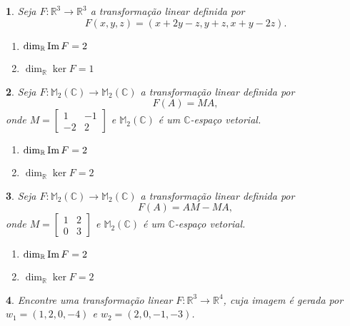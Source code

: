 \documentclass[12pt]{exam}
\newtheorem{exercicio}{}
\newcommand{\im}{{\rm Im\,}}
\newcommand{\real}{\mathbb{R}}
\newcommand{\complex}{\mathbb{C}}
\newcommand{\cp}[1]{\mathbb{#1}}
\begin{document}
\begin{exercicio}
  Seja $F : \real^3 \to \real^3$ a transforma\c{c}\~ao linear definida por
  \[
    F(x,y,z) = (x + 2y - z, y + z, x + y - 2z).
  \]
  \begin{solucao}
    \begin{enumerate}[label=({\alph*})]
      \item $\dim_\real\im F = 2$
      \item $\dim_\real\ker F = 1$
    \end{enumerate}
  \end{solucao}
\end{exercicio}

\begin{exercicio}
  Seja $F : \cp{M}_2(\complex) \to \cp{M}_2(\complex)$ a transforma\c{c}\~ao linear definida por
  \[
    F(A) = MA,
  \]
  onde $M = \begin{bmatrix}
    1 & -1\\-2 & 2
  \end{bmatrix}$ e $\cp{M}_2(\complex)$ \'e um $\complex$-espa\c{c}o vetorial.
  \begin{solucao}
    \begin{enumerate}[label=({\alph*})]
      \item $\dim_\real\im F = 2$
      \item $\dim_\real\ker F = 2$
    \end{enumerate}
  \end{solucao}
\end{exercicio}

\begin{exercicio}\label{nucleo_imagem_fim}
  Seja $F : \cp{M}_2(\complex) \to \cp{M}_2(\complex)$ a transforma\c{c}\~ao linear definida por
  \[
    F(A) = AM - MA,
  \]
  onde $M = \begin{bmatrix}
    1 & 2\\0 & 3
  \end{bmatrix}$ e $\cp{M}_2(\complex)$ \'e um $\complex$-espa\c{c}o vetorial.
  \begin{solucao}
    \begin{enumerate}[label=({\alph*})]
      \item $\dim_\real\im F = 2$
      \item $\dim_\real\ker F = 2$
    \end{enumerate}
  \end{solucao}
\end{exercicio}

\begin{exercicio}
  Encontre uma transforma\c{c}\~ao linear $F : \real^3 \to \real^4$, cuja imagem \'e gerada por $w_1 = (1,2,0,-4)$ e $w_2 = (2,0,-1,-3)$.
\end{exercicio}
\end{document}

